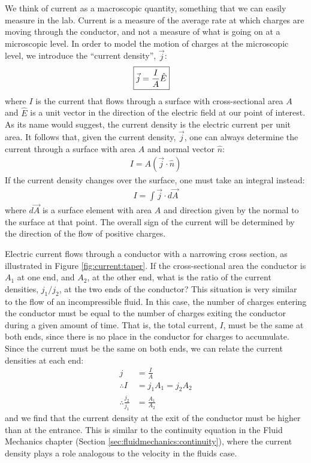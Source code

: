 We think of current as a macroscopic quantity, something that we can easily measure in the lab. Current is a measure of the average rate at which charges are moving through the conductor, and not a measure of what is going on at a microscopic level. In order to model the motion of charges at the microscopic level, we introduce the ``current density'', $\vec j$:
\begin{align*}
\Aboxed{\vec j = \frac{I}{A}\hat E}
\end{align*}
where $I$ is the current that flows through a surface with cross-sectional area $A$ and $\hat E$ is a unit vector in the direction of the electric field at our point of interest. As its name would suggest, the current density is the electric current per unit area. It follows that, given the current density, $\vec j$, one can always determine the current through a surface with area $A$ and normal vector $\hat n$:
\begin{align*}
I = A(\vec j\cdot \hat n)
\end{align*}
If the current density changes over the surface, one must take an integral instead:
\begin{align*}
I=\int \vec j \cdot d\vec A
\end{align*}
where $d\vec A$ is a surface element with area $A$ and direction given by the normal to the surface at that point. The overall sign of the current will be determined by the direction of the flow of positive charges.

\begin{example}{Electric current flows through a conductor with a narrowing cross section, as illustrated in Figure \ref{fig:current:taper}. If the cross-sectional area the conductor is $A_1$ at one end, and $A_2$, at the other end, what is the ratio of the current densities, $j_1/j_2$, at the two ends of the conductor?}
This situation is very similar to the flow of an incompressible fluid. In this case, the number of charges entering the conductor must be equal to the number of charges exiting the conductor during a given amount of time. That is, the total current, $I$, must be the same at both ends, since there is no place in the conductor for charges to accumulate. Since the current must be the same on both ends, we can relate the current densities at each end:
\begin{align*}
j&=\frac{I}{A}\\
\therefore I&=j_1A_1=j_2A_2\\
\therefore \frac{j_2}{j_1}&=\frac{A_1}{A_2}
\end{align*}
and we find that the current density at the exit of the conductor must be higher than at the entrance. This is similar to the continuity equation in the Fluid Mechanics chapter (Section \ref{sec:fluidmechanics:continuity}), where the current density plays a role analogous to the velocity in the fluids case.
\end{example}

